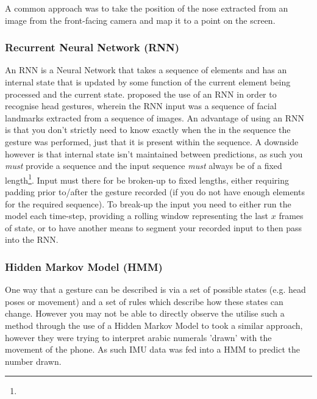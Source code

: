 A common approach was to take the position of the nose extracted from an image from the front-facing camera and map it to a point on the screen\cite{gorodnichy2004nouse, roig2015face, varona2008hands}. 

\subsubsection{Recurrent Neural Network (RNN)}\nl
An RNN is a Neural Network that takes a sequence of elements and has an internal state that is updated by some function of the current element being processed and the current state.
\citeauthor{sharma2018recognizing} proposed the use of an RNN in order to recognise head gestures, wherein the RNN input was a sequence of facial landmarks extracted from a sequence of images\cite{sharma2018recognizing}. 
An advantage of using an RNN is that you don't strictly need to know exactly when the in the sequence the gesture was performed, just that it is present within the sequence.
A downside however is that internal state isn't maintained between predictions, as such you \textit{must} provide a sequence and the input sequence \textit{must} always be of a fixed length\footnote{}. Input must there for be broken-up to fixed lengths, either requiring padding prior to/after the gesture recorded (if you do not have enough elements for the required sequence). To break-up the input you need to either run the model each time-step, providing a rolling window representing the last $x$ frames of state, or to have another means to segment your recorded input to then pass into the RNN.

\subsubsection{Hidden Markov Model (HMM)}\nl
One way that a gesture can be described is via a set of possible states (e.g. head poses or movement) and a set of rules which describe how these states can change.
However you may not be able to directly observe the 
\citeauthor{elmezain2008hidden} utilise such a method through the use of a Hidden Markov Model to \cite{elmezain2008hidden}
\citeauthor{neelasagar2015real} took a similar approach, however they were trying to interpret arabic numerals 'drawn' with the movement of the phone\cite{neelasagar2015real}. As such IMU data was fed into a HMM to predict the number drawn.

